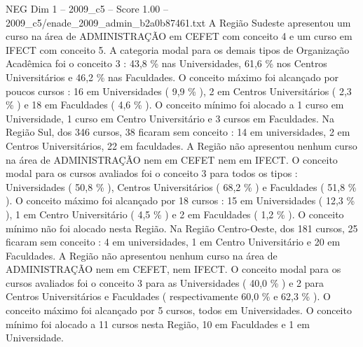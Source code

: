 \begin{textsample}{NEG Dim 1 – 2009\_c5 – Score 1.00 – 2009\_c5/enade\_2009\_admin\_b2a0b87461.txt}
A Região Sudeste apresentou um curso na área de ADMINISTRAÇÃO em CEFET com conceito 4 e um curso em IFECT com conceito 5.
A categoria modal para os demais tipos de Organização Acadêmica foi o conceito 3 : 43,8 \% nas Universidades, 61,6 \% nos Centros Universitários e 46,2 \% nas Faculdades.
O conceito máximo foi alcançado por poucos cursos : 16 em Universidades ( 9,9 \% ), 2 em Centros Universitários ( 2,3 \% ) e 18 em Faculdades ( 4,6 \% ).
O conceito mínimo foi alocado a 1 curso em Universidade, 1 curso em Centro Universitário e 3 cursos em Faculdades.
Na Região Sul, dos 346 cursos, 38 ficaram sem conceito : 14 em universidades, 2 em Centros Universitários, 22 em faculdades.
A Região não apresentou nenhum curso na área de ADMINISTRAÇÃO nem em CEFET nem em IFECT.
O conceito modal para os cursos avaliados foi o conceito 3 para todos os tipos : Universidades ( 50,8 \% ), Centros Universitários ( 68,2 \% ) e Faculdades ( 51,8 \% ).
O conceito máximo foi alcançado por 18 cursos : 15 em Universidades ( 12,3 \% ), 1 em Centro Universitário ( 4,5 \% ) e 2 em Faculdades ( 1,2 \% ).
O conceito mínimo não foi alocado nesta Região.
Na Região Centro-Oeste, dos 181 cursos, 25 ficaram sem conceito : 4 em universidades, 1 em Centro Universitário e 20 em Faculdades.
A Região não apresentou nenhum curso na área de ADMINISTRAÇÃO nem em CEFET, nem IFECT.
O conceito modal para os cursos avaliados foi o conceito 3 para as Universidades ( 40,0 \% ) e 2 para Centros Universitários e Faculdades ( respectivamente 60,0 \% e 62,3 \% ).
O conceito máximo foi alcançado por 5 cursos, todos em Universidades.
O conceito mínimo foi alocado a 11 cursos nesta Região, 10 em Faculdades e 1 em Universidade.

\end{textsample}
